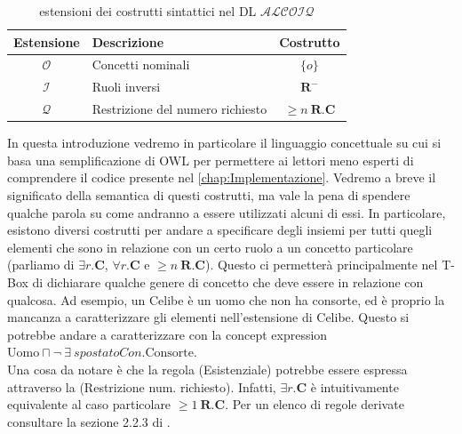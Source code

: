 \begin{table}
	\centering
	\begin{tabular}{c l c}
		\hline
		Estensione & Descrizione & Costrutto \\
		\hline
		$\mathcal{O}$ & Concetti nominali & $\{o\}$\\
		$\mathcal{I}$ & Ruoli inversi & $ \mathbf{R} ^-$\\
		$\mathcal{Q}$ & Restrizione del numero richiesto & $\ge n\ \mathbf{R} . \mathbf{C} $\\
		
		\hline
	\end{tabular}
	\caption{estensioni dei costrutti sintattici nel DL $\mathcal{ALCOIQ}$}
	\label{tab:ALCOIQExtensions}
\end{table}
In questa introduzione vedremo in particolare il linguaggio concettuale su cui si basa una semplificazione di OWL per permettere ai lettori meno esperti di comprendere il codice presente nel \autoref{chap:Implementazione}.
\noindent
Vedremo a breve il significato della semantica di questi costrutti, ma vale la pena di spendere qualche parola su come andranno a essere utilizzati alcuni di essi. In particolare, esistono diversi costrutti per andare a specificare degli insiemi per tutti quegli elementi che sono in relazione con un certo ruolo a un concetto particolare (parliamo di $\exists r. \mathbf{C}$,  $\forall r. \mathbf{C}$ e $\ge n\ \mathbf{R} . \mathbf{C}$). Questo ci permetterà principalmente nel T-Box di dichiarare qualche genere di concetto che deve essere in relazione con qualcosa. Ad esempio, un Celibe è un uomo che non ha consorte, ed è proprio la mancanza a caratterizzare gli elementi nell'estensione di Celibe. Questo si potrebbe andare a caratterizzare con la concept expression $\text{Uomo}\sqcap \neg\ \exists\ \textit{spostatoCon}. \text{Consorte}$.\\
Una cosa da notare è che la regola (Esistenziale) potrebbe essere espressa attraverso la (Restrizione num. richiesto). Infatti, $\exists r. \mathbf{C}$ è intuitivamente equivalente al caso particolare $\ge 1\ \mathbf{R}. \mathbf{C}$. Per un elenco di regole derivate consultare la sezione 2.2.3 di \cite{leinbergerphdthesis}.


